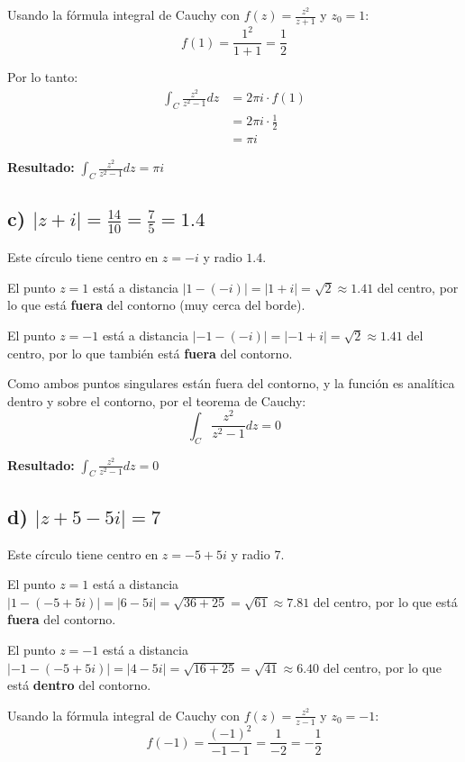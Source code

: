 \documentclass{article}
\begin{document}
Usando la fórmula integral de Cauchy con $f(z) = \frac{z^2}{z + 1}$ y $z_0 = 1$:
$$f(1) = \frac{1^2}{1 + 1} = \frac{1}{2}$$

Por lo tanto:
\begin{align*}
\int_C \frac{z^2}{z^2 - 1} dz &= 2\pi i \cdot f(1) \\
                              &= 2\pi i \cdot \frac{1}{2} \\
                              &= \pi i
\end{align*}

\textbf{Resultado:} $\int_C \frac{z^2}{z^2 - 1} dz = \pi i$

\subsection*{c) $|z + i| = \frac{14}{10} = \frac{7}{5} = 1.4$}

Este círculo tiene centro en $z = -i$ y radio $1.4$.

El punto $z = 1$ está a distancia $|1 - (-i)| = |1 + i| = \sqrt{2} \approx 1.41$ del centro, por lo que está \textbf{fuera} del contorno (muy cerca del borde).

El punto $z = -1$ está a distancia $|-1 - (-i)| = |-1 + i| = \sqrt{2} \approx 1.41$ del centro, por lo que también está \textbf{fuera} del contorno.

Como ambos puntos singulares están fuera del contorno, y la función es analítica dentro y sobre el contorno, por el teorema de Cauchy:
$$\int_C \frac{z^2}{z^2 - 1} dz = 0$$

\textbf{Resultado:} $\int_C \frac{z^2}{z^2 - 1} dz = 0$

\subsection*{d) $|z + 5 - 5i| = 7$}

Este círculo tiene centro en $z = -5 + 5i$ y radio 7.

El punto $z = 1$ está a distancia $|1 - (-5 + 5i)| = |6 - 5i| = \sqrt{36 + 25} = \sqrt{61} \approx 7.81$ del centro, por lo que está \textbf{fuera} del contorno.

El punto $z = -1$ está a distancia $|-1 - (-5 + 5i)| = |4 - 5i| = \sqrt{16 + 25} = \sqrt{41} \approx 6.40$ del centro, por lo que está \textbf{dentro} del contorno.

Usando la fórmula integral de Cauchy con $f(z) = \frac{z^2}{z - 1}$ y $z_0 = -1$:
$$f(-1) = \frac{(-1)^2}{-1 - 1} = \frac{1}{-2} = -\frac{1}{2}$$
\end{document}
